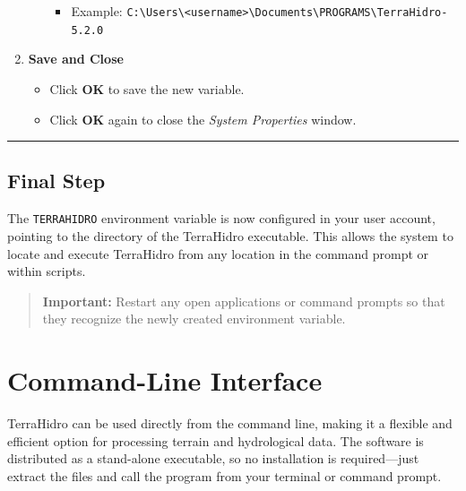 \documentclass[
]{book}
\providecommand{\tightlist}{%
  \setlength{\itemsep}{0pt}\setlength{\parskip}{0pt}}
\theoremstyle{definition}
\theoremstyle{definition}
\theoremstyle{definition}
\theoremstyle{definition}
\theoremstyle{remark}
\begin{document}
\begin{enumerate}
\begin{itemize}
    \begin{itemize}
    \tightlist
    \item
      Example: \texttt{C:\textbackslash{}Users\textbackslash{}\textless{}username\textgreater{}\textbackslash{}Documents\textbackslash{}PROGRAMS\textbackslash{}TerraHidro-5.2.0}
    \end{itemize}
  \end{itemize}
\item
  \textbf{Save and Close}

  \begin{itemize}
  \tightlist
  \item
    Click \textbf{OK} to save the new variable.\\
  \item
    Click \textbf{OK} again to close the \emph{System Properties} window.
  \end{itemize}
\end{enumerate}

\begin{center}\rule{0.5\linewidth}{0.5pt}\end{center}

\subsection*{Final Step}\label{final-step}

The \texttt{TERRAHIDRO} environment variable is now configured in your user account, pointing to the directory of the TerraHidro executable. This allows the system to locate and execute TerraHidro from any location in the command prompt or within scripts.

\begin{quote}
\textbf{Important:} Restart any open applications or command prompts so that they recognize the newly created environment variable.
\end{quote}

\section*{Command-Line Interface}\label{command-line-interface}

TerraHidro can be used directly from the command line, making it a flexible and efficient option for processing terrain and hydrological data. The software is distributed as a stand-alone executable, so no installation is required---just extract the files and call the program from your terminal or command prompt.
\end{document}
